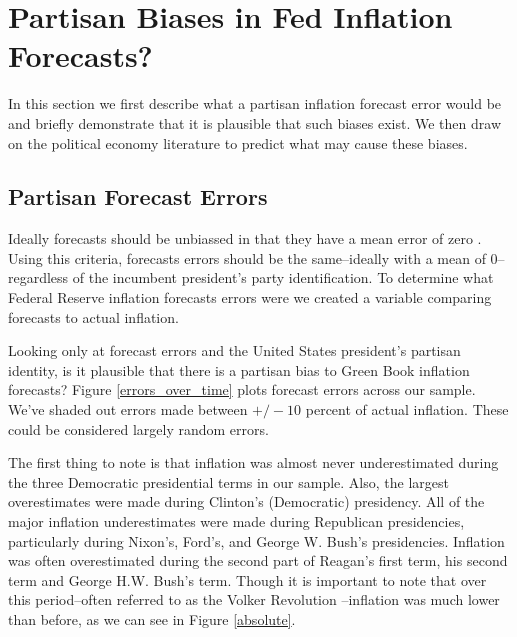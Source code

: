 \documentclass[a4paper]{article}\usepackage{graphicx, color}
\begin{document}


\section{Partisan Biases in Fed Inflation Forecasts?}

In this section we first describe what a partisan inflation forecast error would be and briefly demonstrate that it is plausible that such biases exist. We then draw on the political economy literature to predict what may cause these biases.

\subsection{Partisan Forecast Errors}

Ideally forecasts should be unbiassed in that they have a mean error of zero \citep[5]{Bruck2006}. Using this criteria, forecasts errors should be the same--ideally with a mean of 0--regardless of the incumbent president's party identification. To determine what Federal Reserve inflation forecasts errors were we created a variable comparing forecasts to actual inflation. 

Looking only at forecast errors and the United States president's partisan identity, is it plausible that there is a partisan bias to Green Book inflation forecasts? Figure \ref{errors_over_time} plots forecast errors across our sample. We've shaded out errors made between $+/- 10$ percent of actual inflation. These could be considered largely random errors. 

The first thing to note is that inflation was almost never underestimated during the three Democratic presidential terms in our sample. Also, the largest overestimates were made during Clinton's (Democratic) presidency. All of the major inflation underestimates were made during Republican presidencies, particularly during Nixon's, Ford's, and George W. Bush's presidencies. Inflation was often overestimated during the second part of Reagan's first term, his second term and George H.W. Bush's term. Though it is important to note that over this period--often referred to as the Volker Revolution \citep[see][]{Bartels1985}--inflation was much lower than before, as we can see in Figure \ref{absolute}.
\end{document}
